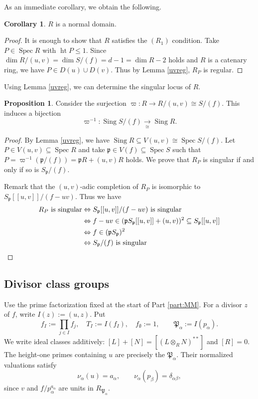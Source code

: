 \documentclass[a4paper,reqno]{amsart}
\def\p{\mathfrak{p}}
\DeclareMathOperator{\Spec}{Spec}
\DeclareMathOperator{\Sing}{Sing}
\DeclareMathOperator{\height}{ht}
\theoremstyle{definition}
\newtheorem{Prop}[Thm]{Proposition}
\newtheorem{Cor}[Thm]{Corollary}
\begin{document}
As an immediate corollary, we obtain the following.

\begin{Cor}\label{cor:uvf-normality}
$R$ is a normal domain.
\end{Cor}
\begin{proof}
It is enough to show that $R$ satisfies the $(R_1)$ condition. Take $P\in\Spec R$ with $\height P\le1$. Since $\dim R/(u,v)=\dim S/(f)=d-1=\dim R-2$ holds and $R$ is a catenary ring, we have $P\in D(u)\cup D(v)$. Thus by Lemma \ref{uvreg}, $R_P$ is regular.
\end{proof}

Using Lemma \ref{uvreg}, we can determine the singular locus of $R$.

\begin{Prop}
Consider the surjection $\varpi\colon R\to R/(u,v)\cong S/(f)$. This induces a bijection
\[\varpi^{-1}\colon\Sing S/(f)\xrightarrow[\cong]{}\Sing R.\]
\end{Prop}
\begin{proof}
By Lemma \ref{uvreg}, we have $\Sing R\subseteq V(u,v)\cong\Spec S/(f)$. Let $P\in V(u,v)\subseteq\Spec R$ and take $\p\in V(f)\subseteq\Spec S$ such that $P=\varpi^{-1}(\p/(f))=\p R+(u,v)R$ holds. We prove that $R_P$ is singular if and only if so is $S_\p/(f)$.

Remark that the $(u,v)$-adic completion of $R_P$ is isomorphic to $S_\p[[u,v]]/(f-uv)$. Thus we have
\begin{equation*}
\begin{split}
R_P\text{ is singular}&\Leftrightarrow S_\p[[u,v]]/(f-uv)\text{ is singular}\\
&\Leftrightarrow f-uv\in(\p S_\p[[u,v]]+(u,v))^2\subseteq S_\p[[u,v]]\\
&\Leftrightarrow f\in(\p S_\p)^2\\
&\Leftrightarrow S_\p/(f)\text{ is singular}\qedhere
\end{split}
\end{equation*}
\end{proof}

\subsection{Divisor class groups}\label{sec:divisor-class-groups}

Use the prime factorization fixed at the start of Part \ref{part:MM}. For a divisor $z$ of $f$, write $I(z):=(u,z)$. Put
\[
f_I:=\prod_{j\in I}f_j,\quad T_I:=I(f_I),\quad f_\emptyset:=1,
\qquad \mathfrak P_\alpha:=I(p_\alpha).
\]
We write ideal classes additively: $[L]+[N]=[(L\otimes_RN)^{**}]$ and $[R]=0$. The height-one primes containing $u$ are precisely the $\mathfrak P_\alpha$. Their normalized valuations satisfy
\begin{equation}\label{eq:factor-ideal-valuations}
\nu_\alpha(u)=a_\alpha,\qquad \nu_\alpha(p_\beta)=\delta_{\alpha\beta},
\end{equation}
since $v$ and $f/p_\alpha^{a_\alpha}$ are units in $R_{\mathfrak P_\alpha}$.
\end{document}
